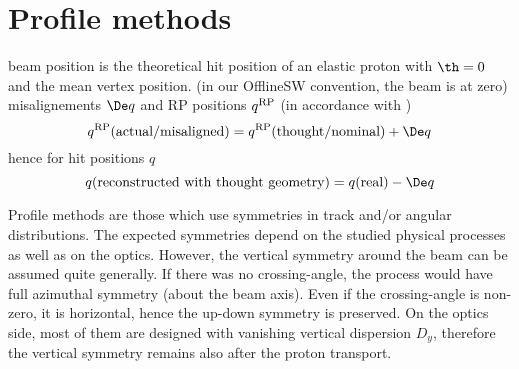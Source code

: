 



\section[al prof]{Profile methods}

\> beam position is the theoretical hit position of an elastic proton with $\th = 0$ and the mean vertex position.
\> (in our OfflineSW convention, the beam is at zero)
\> misalignements $\De q$ and RP positions $q^{\rm RP}$ (in accordance with )
$$q^{\rm RP}(\hbox{actual/misaligned}) = q^{\rm RP}(\hbox{thought/nominal}) + \De q$$
hence for hit positions $q$
$$q(\hbox{reconstructed with thought geometry}) = q(\hbox{real}) - \De q$$

Profile methods are those which use symmetries in track and/or angular distributions. The expected symmetries depend on the studied physical processes as well as on the optics. However, the vertical symmetry around the beam can be assumed quite generally. If there was no crossing-angle, the process would have full azimuthal symmetry (about the beam axis). Even if the crossing-angle is non-zero, it is horizontal, hence the up-down symmetry is preserved. On the optics side, most of them are designed with vanishing vertical dispersion $D_y$, therefore the vertical symmetry remains also after the proton transport.

